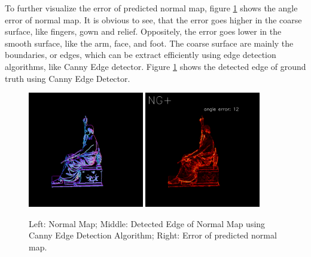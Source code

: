 To further visualize the error of predicted normal map, figure \ref{fig:canny_edge_details} shows the angle error of normal map. 
It is obvious to see, that the error goes higher in the coarse surface, like fingers, gown and relief. Oppositely, the error goes lower in the smooth surface, like the arm, face, and foot. The coarse surface are mainly the boundaries, or edges, which can be extract efficiently using edge detection algorithms, like Canny Edge detector. Figure \ref{fig:canny_edge_details} shows the detected edge of ground truth using Canny Edge Detector.

\begin{figure}[!h]
	\centering
	{\includegraphics[width=0.45\textwidth]{./pic/00349.hpf0.png}}
	{\includegraphics[width=0.45\textwidth]{./pic/00349.error.png}}
	\label{fig:canny_edge_details}
	\caption{Left: Normal Map; Middle: Detected Edge of Normal Map using Canny Edge Detection Algorithm; Right: Error of predicted normal map.}
\end{figure}